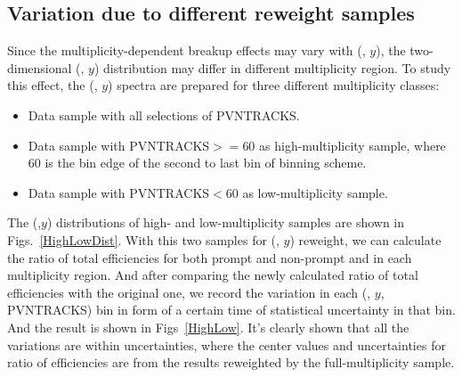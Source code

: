 \subsection{Variation due to different reweight samples}
Since the multiplicity-dependent breakup effects may vary with (\pt, $y$), the two-dimensional (\pt, $y$) distribution may differ in different multiplicity region. To study this effect, the (\pt, $y$) spectra are prepared for three different multiplicity classes:
\begin{itemize}
	\item Data sample with all selections of PVNTRACKS.
	\item Data sample with PVNTRACKS$>=60$ as high-multiplicity sample, where 60 is the bin edge of the second to last bin of \pt binning scheme.
	\item Data sample with PVNTRACKS$<60$ as low-multiplicity sample.
\end{itemize}	
 The (\pt,$y$) distributions of high- and low-multiplicity samples are shown in Figs.~\ref{HighLowDist}. 
With this two samples for (\pt, $y$) reweight, we can calculate the ratio of total efficiencies for both prompt and non-prompt \jpsi and \psitwos in each multiplicity region. And after comparing the newly calculated ratio of total efficiencies with the original one, we record the variation in each (\pt, $y$, PVNTRACKS) bin in form of a certain time of statistical uncertainty in that bin. And the result is shown in Figs~\ref{HighLow}. It's clearly shown that all the variations are within uncertainties, where the center values and uncertainties for ratio of efficiencies are from the results reweighted by the full-multiplicity sample.
